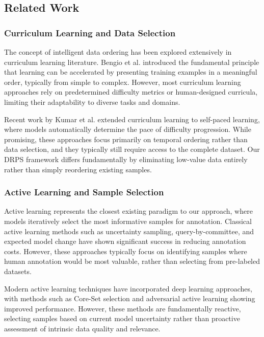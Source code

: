 \documentclass[12pt]{article}
\begin{document}
\subsection{Related Work}\label{related-work}

\subsubsection{Curriculum Learning and Data Selection}\label{curriculum-learning}

The concept of intelligent data ordering has been explored extensively in curriculum learning literature. Bengio et al. introduced the fundamental principle that learning can be accelerated by presenting training examples in a meaningful order, typically from simple to complex. However, most curriculum learning approaches rely on predetermined difficulty metrics or human-designed curricula, limiting their adaptability to diverse tasks and domains.

Recent work by Kumar et al. extended curriculum learning to self-paced learning, where models automatically determine the pace of difficulty progression. While promising, these approaches focus primarily on temporal ordering rather than data selection, and they typically still require access to the complete dataset. Our DRPS framework differs fundamentally by eliminating low-value data entirely rather than simply reordering existing samples.

\subsubsection{Active Learning and Sample Selection}\label{active-learning}

Active learning represents the closest existing paradigm to our approach, where models iteratively select the most informative samples for annotation. Classical active learning methods such as uncertainty sampling, query-by-committee, and expected model change have shown significant success in reducing annotation costs. However, these approaches typically focus on identifying samples where human annotation would be most valuable, rather than selecting from pre-labeled datasets.

Modern active learning techniques have incorporated deep learning approaches, with methods such as Core-Set selection and adversarial active learning showing improved performance. However, these methods are fundamentally reactive, selecting samples based on current model uncertainty rather than proactive assessment of intrinsic data quality and relevance.
\end{document}
